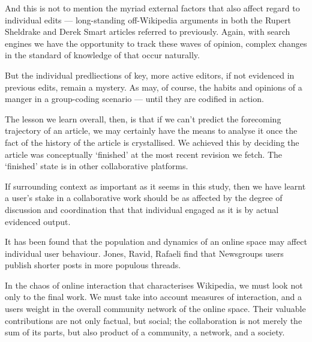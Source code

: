 And this is not to mention the myriad external factors that also
affect regard to individual edits --- long-standing off-Wikipedia
arguments in both the Rupert Sheldrake and Derek Smart articles
referred to previously. Again, with search engines we have the
opportunity to track these waves of opinion, complex changes in the
standard of knowledge of that occur naturally. 

But the individual predliections of key, more active editors, if not
evidenced in previous edits, remain a mystery. As may, of course, the
habits and opinions of a manger in a group-coding scenario --- until
they are codified in action.

The lesson we learn overall, then, is that if we can't predict the
forecoming trajectory of an article, we may certainly have the means
to analyse it once the fact of the history of the article is
crystallised. We achieved this by deciding the article was
conceptually `finished' at the most recent revision we fetch. The
`finished' state is in other collaborative platforms.

If surrounding context as important as it seems in this study, then we
have learnt a user's stake in a collaborative work should be as
affected by the degree of discussion and coordination that that
individual engaged as it is by actual evidenced output.

It has been found that the population and dynamics of an online space
may affect individual user behaviour. Jones, Ravid, Rafaeli find that
Newsgroups users publish shorter posts in more populous threads.

In the chaos of online interaction that characterises Wikipedia, we
must look not only to the final work. We must take into account
measures of interaction, and a users weight in the overall community
network of the online space. Their valuable contributions are not only
factual, but social; the collaboration is not merely the sum of its
parts, but also product of a community, a network, and a society.  




